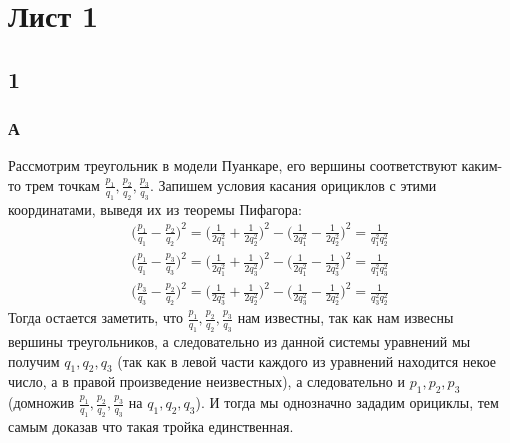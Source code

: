 \newpage		
	\section*{Лист 1}
		
		\subsection*{1}
		\subsubsection*{\textbf{А}}
		Рассмотрим треугольник в модели Пуанкаре, его вершины соответствуют каким-то трем точкам $\frac{p_1}{q_1}, \frac{p_2}{q_2}, \frac{p_3}{q_3}$. Запишем условия касания орициклов с этими координатами, выведя их из теоремы Пифагора:
		\begin{gather*}
			\Big(\frac{p_1}{q_1} - \frac{p_2}{q_2}\Big)^2 = 
			\Big(\frac{1}{2q_1^2} + \frac{1}{2q_2^2}\Big)^2 - \Big(\frac{1}{2q_1^2} - \frac{1}{2q_2^2}\Big)^2 = 
			\frac{1}{q_1^2 q_2^2}\\
			\Big(\frac{p_1}{q_1} - \frac{p_3}{q_3}\Big)^2 = 
			\Big(\frac{1}{2q_1^2} + \frac{1}{2q_3^2}\Big)^2 - \Big(\frac{1}{2q_1^2} - \frac{1}{2q_3^2}\Big)^2 = 
			\frac{1}{q_1^2 q_3^2}\\
			\Big(\frac{p_3}{q_3} - \frac{p_2}{q_2}\Big)^2 = 
			\Big(\frac{1}{2q_3^2} + \frac{1}{2q_2^2}\Big)^2 - \Big(\frac{1}{2q_3^2} - \frac{1}{2q_2^2}\Big)^2 = 
			\frac{1}{q_3^2 q_2^2}
		\end{gather*}
		Тогда остается заметить, что $\frac{p_1}{q_1}, \frac{p_2}{q_2}, \frac{p_3}{q_3}$ нам известны, так как нам извесны вершины треугольников, а следовательно из данной системы уравнений мы получим $q_1, q_2, q_3$ (так как в левой части каждого из уравнений находится некое число, а в правой произведение неизвестных), а следовательно и $p_1, p_2, p_3$ (домножив $\frac{p_1}{q_1}, \frac{p_2}{q_2}, \frac{p_3}{q_3}$ на $q_1, q_2, q_3$). И тогда мы однозначно зададим орициклы, тем самым доказав что такая тройка единственная.
		
		
		
